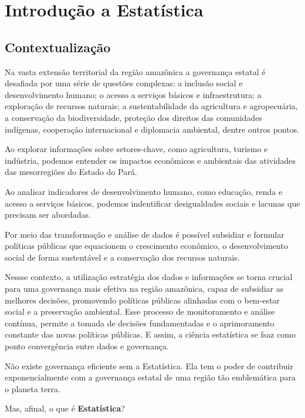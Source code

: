 \chapter{Introdução a Estatística}

\section{Contextualização}

Na vasta extensão territorial da região amazônica a governança estatal é desafiada por uma série de questões complexas: a inclusão social e desenvolvimento humano; o acesso a serviços básicos e infraestrutura; a exploração de recursos naturais; a sustentabilidade da agricultura e agropecuária, a conservação da biodiversidade, proteção dos direitos das comunidades indígenas, cooperação internacional e diplomacia ambiental, dentre outros pontos.\vskip0.3cm

Ao explorar informações sobre setores-chave, como agricultura, turismo e indústria, podemos entender os impactos econômicos e ambientais das atividades das mesorregiões do Estado do Pará.\vskip0.3cm

Ao analisar indicadores de desenvolvimento humano, como educação, renda e acesso a serviços básicos, podemos indentificar desigualdades sociais e lacunas que precisam ser abordadas.\vskip0.3cm

Por meio das transformação e análise de dados é possível subsidiar e formular políticas públicas que equacionem o  crescimento econômico, o desenvolvimento social de forma sustentável e a conservação dos recursos naturais.\vskip0.3cm

Nessse contexto, a utilização estratégia dos dados e informações se torna crucial para uma governança mais efetiva na região amazônica, capaz de subsidiar as melhores decisões, promovendo políticas públicas alinhadas com o bem-estar social e a preservação ambiental. Esse processo de monitoramento e análise contínua, permite a tomada de decisões fundamentadas e o aprimoramento constante das novas políticas públicas. E assim, a ciência estatística se fsaz como ponto convergência entre dados e governança.\vskip0.3cm


Não existe governança eficiente sem a Estatística. Ela tem o poder de contribuir exponencialmente com a governança estatal de uma região tão emblemática para o planeta terra.
\vskip0.3cm

Mas, afinal, o que é \textbf{Estatística}?
\vskip0.3cm



